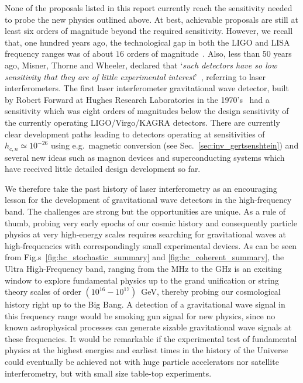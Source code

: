\documentclass[11pt,a4paper]{article}
\begin{document}
None of the proposals listed in this report currently reach the sensitivity needed to probe the new physics outlined above. At best, achievable proposals are still at least six orders of magnitude beyond the required sensitivity. However, we recall that, one hundred years ago, the technological gap in both the LIGO and LISA frequency ranges was of about $16$ orders of magnitude~\cite{Chen:2016isk}. Also, less than 50 years ago, Misner, Thorne and Wheeler, declared that `\textit{such detectors have so low sensitivity that they are of little experimental interest}'~\cite{Misner:1974qy}, referring to laser interferometers. The first laser interferometer gravitational wave detector, built by Robert Forward at Hughes Research Laboratories in the 1970's~\cite{PhysRevD.17.379} had a sensitivity which was eight orders of magnitudes below the design sensitivity of the currently operating LIGO/Virgo/KAGRA detectors. There are currently clear development paths leading to detectors operating at sensitivities of $h_{c, n} \simeq 10^{-26}$ using e.g.\ magnetic conversion (see Sec.~\ref{sec:inv_gertsenshtein}) and several new ideas such as magnon devices and superconducting systems which have received little detailed design development so far.

We therefore take the past history of laser interferometry as an encouraging lesson for the development of gravitational wave detectors in the high-frequency band. The challenges are strong but the opportunities are unique. As a rule of thumb, probing very early epochs of our cosmic history and consequently particle physics at very high-energy scales requires searching for gravitational waves at high-frequencies with correspondingly small experimental devices. As can be seen from Fig.s~\ref{fig:hc_stochastic_summary} and \ref{fig:hc_coherent_summary}, the Ultra High-Frequency band, ranging from the MHz to the GHz is an exciting window to explore fundamental physics up to the grand unification or string theory scales of order $(10^{16}-10^{17})$~GeV, thereby probing our cosmological history right up to the Big Bang. A detection of a gravitational wave signal in this frequency range would be smoking gun signal for new physics, since no known astrophysical processes can generate sizable gravitational wave signals at these frequencies. It would be remarkable if the experimental test of fundamental physics at the highest energies and earliest times in the history of the Universe could eventually be achieved not with huge particle accelerators nor satellite interferometry, but with small size table-top experiments.
\end{document}

